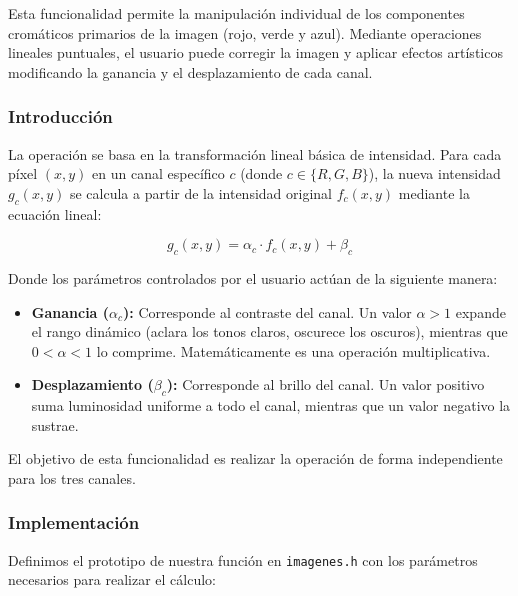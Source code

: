 \documentclass[11pt]{article}
\begin{document}
      \noindent
      Esta funcionalidad permite la manipulación individual de los componentes
      cromáticos primarios de la imagen (rojo, verde y azul). Mediante operaciones
      lineales puntuales, el usuario puede corregir la imagen y aplicar efectos
      artísticos modificando la ganancia y el desplazamiento de cada canal.

      \subsubsection{Introducción}

          \noindent
          La operación se basa en la transformación lineal básica de intensidad. Para
          cada píxel $(x,y)$ en un canal específico $c$ (donde $c \in \{R, G, B\}$), la
          nueva intensidad $g_c(x,y)$ se calcula a partir de la intensidad original
          $f_c(x,y)$ mediante la ecuación lineal: \cite{opencv_basic_linear_transform}

          \begin{equation}
              g_c(x,y) = \alpha_c \cdot f_c(x,y) + \beta_c
          \end{equation}

          \noindent
          Donde los parámetros controlados por el usuario actúan de la siguiente manera:

          \begin{itemize}
              \item \textbf{Ganancia ($\alpha_c$):} Corresponde al contraste del canal. Un valor $\alpha > 1$ expande el rango dinámico (aclara los tonos claros, oscurece los oscuros), mientras que $0 < \alpha < 1$ lo comprime. Matemáticamente es una operación multiplicativa.
              \item \textbf{Desplazamiento ($\beta_c$):} Corresponde al brillo del canal. Un valor positivo suma luminosidad uniforme a todo el canal, mientras que un valor negativo la sustrae.
          \end{itemize}

          \noindent
          El objetivo de esta funcionalidad es realizar la operación de forma independiente para los tres canales.

      \subsubsection{Implementación}

          \noindent
          Definimos el prototipo de nuestra función en \texttt{imagenes.h} con los parámetros necesarios para realizar el cálculo:
\end{document}
